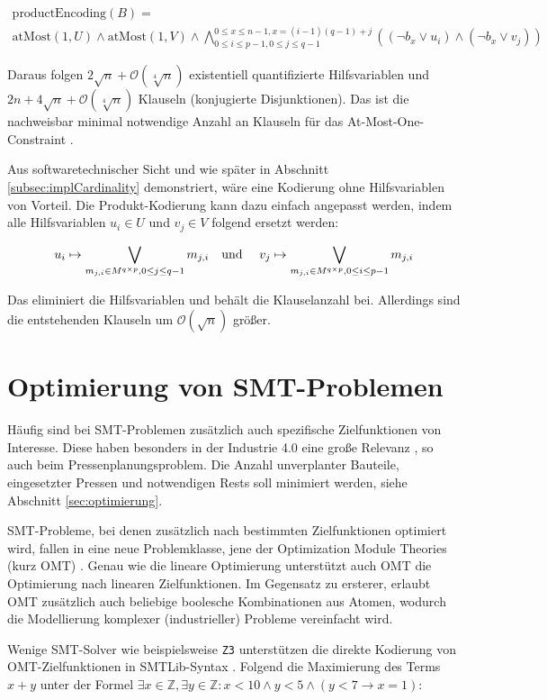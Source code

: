 \begin{multline*}
    \text{productEncoding}(B) = \\
    \text{atMost}(1,U) \land \text{atMost}(1,V) \land \bigwedge_{0 \leq i \leq p-1, 0 \leq j \leq q-1}^{0 \leq x \leq n-1, x = (i-1)(q-1)+j} ((\neg b_x \lor u_i) \land (\neg b_x \lor v_j))
\end{multline*}

Daraus folgen $2 \sqrt{n} + \mathcal{O}(\sqrt[4]{n})$ existentiell quantifizierte Hilfsvariablen und $2n + 4\sqrt{n} + \mathcal{O}(\sqrt[4]{n})$ Klauseln (konjugierte Disjunktionen).
Das ist die nachweisbar minimal notwendige Anzahl an Klauseln für das At-Most-One-Constraint \cite{amoChen, lowerBoundAMO}.

Aus softwaretechnischer Sicht und wie später in Abschnitt \ref{subsec:implCardinality} demonstriert, wäre eine Kodierung ohne Hilfsvariablen von Vorteil.
Die Produkt-Kodierung kann dazu einfach angepasst werden, indem alle Hilfsvariablen $u_i \in U$ und $v_j \in V$ folgend ersetzt werden:

\[
    u_i \mapsto \bigvee_{m_{j,i} \in M^{q \times p}, 0 \leq j \leq q-1} m_{j,i} \text{\quad und \quad}
    v_j \mapsto \bigvee_{m_{j,i} \in M^{q \times p}, 0 \leq i \leq p-1} m_{j,i}
\]

Das eliminiert die Hilfsvariablen und behält die Klauselanzahl bei.
Allerdings sind die entstehenden Klauseln um $\mathcal{O}(\sqrt{n})$ größer.

\section{Optimierung von SMT-Problemen}
Häufig sind bei SMT-Problemen zusätzlich auch spezifische Zielfunktionen von Interesse.
Diese haben besonders in der Industrie 4.0 eine große Relevanz \cite{omt}, so auch beim Pressenplanungsproblem.
Die Anzahl unverplanter Bauteile, eingesetzter Pressen und notwendigen Rests soll minimiert werden, siehe Abschnitt \ref{sec:optimierung}.

SMT-Probleme, bei denen zusätzlich nach bestimmten Zielfunktionen optimiert wird, fallen in eine neue Problemklasse,
jene der Optimization Module Theories (kurz OMT) \cite{omt}.
Genau wie die lineare Optimierung unterstützt auch OMT die Optimierung nach linearen Zielfunktionen.
Im Gegensatz zu ersterer, erlaubt OMT zusätzlich auch beliebige boolesche Kombinationen aus Atomen, wodurch die Modellierung komplexer (industrieller) Probleme vereinfacht wird.

Wenige SMT-Solver wie beispielsweise \texttt{Z3} unterstützen die direkte Kodierung von OMT-Zielfunktionen in SMTLib-Syntax \cite{nuz3}.
Folgend die Maximierung des Terms $x + y$ unter der Formel $\exists x \in \mathbb{Z}, \exists y \in \mathbb{Z}: x < 10 \land y < 5 \land (y < 7 \rightarrow x = 1)$:

